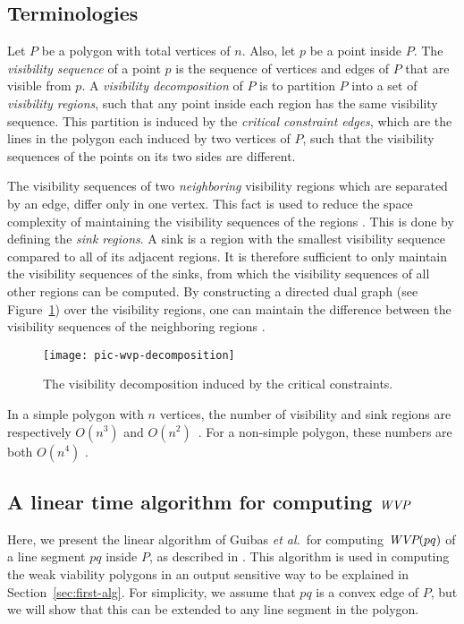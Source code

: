 \documentclass[5p]{elsarticle}
\def\WVP{\mbox{\it{WVP}}}
\def\P{\mbox{${P}$}}
\begin{document}
\subsection{Terminologies} \label{sec:pre:decompos}
Let $\P$ be a polygon with total vertices of $n$. Also, let $p$ be 
a point inside $\P$.
The {\em visibility sequence} of a point $p$ is 
the sequence of vertices and edges of $\P$ that are visible from $p$. 
A {\em visibility decomposition} of $\P$ is to partition $\P$ into a set of 
{\em visibility regions}, such that any point inside each region has the same visibility sequence. 
This partition is induced by 
the {\em critical constraint edges},
which are the lines in the polygon each induced by two vertices of $\P$,
such that the visibility sequences of the points
on its two sides are different.
	

The visibility sequences of two  {\em neighboring} visibility regions which are separated by an edge, 
differ only in one vertex.
This fact is used to reduce the space complexity of maintaining the 
visibility sequences of the regions \cite{bose}.
This is done by defining the {\em sink regions}. 
A sink is a region with the smallest visibility sequence compared to all 
of its adjacent regions.
It is therefore sufficient to only maintain the visibility sequences of the sinks,
from which the
visibility sequences of all other regions can be computed.
By constructing a directed dual graph (see Figure~\ref{fig:f2}) over 
the visibility regions, one can maintain the difference between the visibility sequences of 
the neighboring regions \cite{bose}.




\begin{figure}[h]
  \centering
  \texttt{[image: pic-wvp-decomposition]} 
  \caption{The visibility decomposition induced by the critical constraints.}
  \label{fig:f2}
\end{figure}


In a simple polygon with $n$ vertices, the number of visibility
and sink regions are respectively $O(n^3)$ and $O(n^2)$~\cite{bose}.
For a non-simple polygon, these numbers are both $O(n^4)$ \cite{zarei}.



\subsection{A linear time algorithm for computing $\WVP$} \label{sec:guibas}
Here, we present the linear algorithm of Guibas {\em et al.}\ for computing
$\WVP(pq)$ of a line segment $pq$ inside $\P$, 
as described in \cite{ghosh}.
This algorithm is used in computing the weak viability polygons in an output sensitive way 
to be explained in Section~\ref{sec:first-alg}.
For simplicity, we assume that $pq$ is a convex edge of $\P$,
but we will show that this can be extended to any line segment in the polygon.
\end{document}

